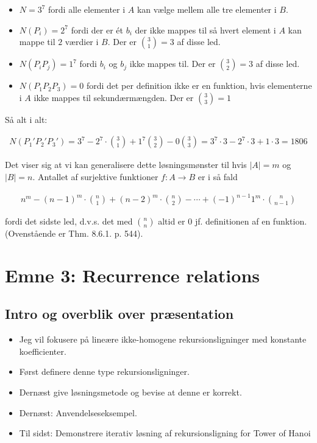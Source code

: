 \documentclass[12pt]{article}
\begin{document}
\begin{itemize}
    \item $N=3^7$ fordi alle elementer i $A$ kan vælge mellem alle tre elementer i $B$. 
    \item $N(P_i)=2^7$  fordi der er ét $b_i$ der ikke mappes til så hvert element i $A$ kan mappe til $2$ værdier i $B$. Der er $\binom{3}{1}=3$ af disse led.  
    \item $N(P_iP_j)=1^7$ fordi $b_i$ og $b_j$ ikke mappes til. Der er $\binom{3}{2}=3$ af disse led. 
    \item $N(P_1P_2P_3)=0$ fordi det per definition ikke er en funktion, hvis elementerne i $A$ ikke mappes til sekundærmængden. Der er $\binom{3}{3}=1$
\end{itemize}

Så alt i alt: 

\begin{align*}
    N(P_1'P_2'P_3')=3^7 -2^7 \cdot \binom{3}{1} +1^7 \binom{3}{2}-0 \binom{3}{3}=3^7 \cdot 3-2^7 \cdot 3+1 \cdot 3 = 1806
\end{align*}

Det viser sig at vi kan generalisere dette løsningsmønster til hvis $|A|=m$ og $|B|=n$. Antallet af surjektive funktioner $f: A \rightarrow B$ er i så fald

\begin{align*}
    n^m - (n-1)^m \cdot \binom{n}{1} + (n-2)^m \cdot \binom{n}{2} - \cdots +(-1)^{n-1} 1^m \cdot \binom{n}{n-1}
\end{align*}

fordi det sidste led, d.v.s. det med $\binom{n}{n}$ altid er 0 jf. definitionen af en funktion. (Ovenstående er Thm. 8.6.1. p. 544).
 
\newpage


\section{Emne 3: Recurrence relations}

\subsection*{Intro og overblik over præsentation}

\begin{itemize}
    \item Jeg vil fokusere på lineære ikke-homogene rekursionsligninger med konstante koefficienter.
    \item Først definere denne type rekursionsligninger. 
    \item Dernæst give løsningsmetode og bevise at denne er     korrekt. 
    \item Dernæst: Anvendelseseksempel. 
    \item Til sidst: Demonstrere iterativ løsning af rekursionsligning for Tower of Hanoi
\end{itemize}
\end{document}
